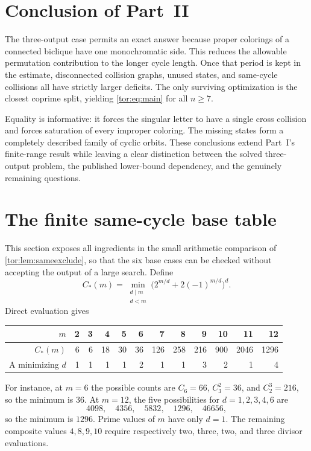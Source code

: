 \documentclass[11pt,a4paper]{article}
\numberwithin{equation}{section}
\theoremstyle{definition}
\theoremstyle{remark}
\begin{document}
\section{Conclusion of Part~II}\label{tor:sec:conclusion}

The three-output case permits an exact answer because proper colorings of a
connected biclique have one monochromatic side. This reduces the allowable
permutation contribution to the longer cycle length. Once that period is kept
in the estimate, disconnected collision graphs, unused states, and same-cycle
collisions all have strictly larger deficits. The only surviving optimization
is the closest coprime split, yielding \eqref{tor:eq:main} for all $n\ge7$.

Equality is informative: it forces the singular letter to have a single cross
collision and forces saturation of every improper coloring. The missing states
form a completely described family of cyclic orbits. These conclusions extend
Part~I's finite-range result while leaving a clear distinction between the
solved three-output problem, the published lower-bound dependency, and the
genuinely remaining questions.

\section{The finite same-cycle base table}\label{tor:sec:small}

This section exposes all ingredients in the small arithmetic comparison of
\cref{tor:lem:sameexclude}, so that the six base cases can be checked without
accepting the output of a large search. Define
\[
 C_*(m)=\min_{\substack{d\mid m\\d<m}}
 \bigl(2^{m/d}+2(-1)^{m/d}\bigr)^d.
\]
Direct evaluation gives
\begin{center}
\begin{tabular}{@{}rrrrrrrrrrrr@{}}
\toprule
$m$ & 2 & 3 & 4 & 5 & 6 & 7 & 8 & 9 & 10 & 11 & 12\\
\midrule
$C_*(m)$ & 6 & 6 & 18 & 30 & 36 & 126 & 258 & 216 & 900 & 2046 & 1296\\
A minimizing $d$ & 1 & 1 & 1 & 1 & 2 & 1 & 1 & 3 & 2 & 1 & 4\\
\bottomrule
\end{tabular}
\end{center}
For instance, at $m=6$ the possible counts are $C_6=66$, $C_3^2=36$, and
$C_2^3=216$, so the minimum is $36$. At $m=12$, the five possibilities for
$d=1,2,3,4,6$ are
\[
 4098,\quad4356,\quad5832,\quad1296,\quad46656,
\]
so the minimum is $1296$. Prime values of $m$ have only $d=1$. The remaining
composite values $4,8,9,10$ require respectively two, three, two, and three
divisor evaluations.
\end{document}
